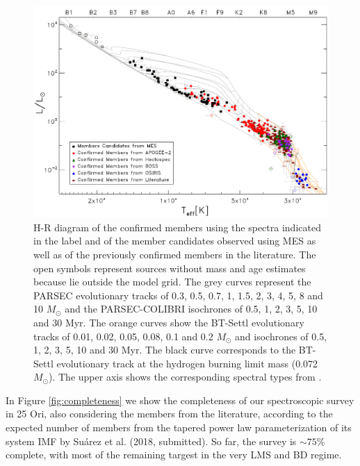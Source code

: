 \documentclass[12pt]{article}
\begin{document}
\begin{figure}%
	\includegraphics[width=1.0\textwidth]{HR_25Ori.pdf}
	\caption[H-R diagram of all the so far confirmed members in this work and of the member candidates to high/intermediate mass stars.]{H-R diagram of the confirmed members using the spectra indicated in the label and of the member candidates observed using MES as well as of the previously confirmed members in the literature. The open symbols represent sources without mass and age estimates because lie outside the model grid. The grey curves represent the PARSEC evolutionary tracks of 0.3, 0.5, 0.7, 1, 1.5, 2, 3, 4, 5, 8 and 10 $M_\odot$ and the PARSEC-COLIBRI isochrones of 0.5, 1, 2, 3, 5, 10 and 30 Myr. The orange curves show the BT-Settl evolutionary tracks of 0.01, 0.02, 0.05, 0.08, 0.1 and 0.2 $M_\odot$ and isochrones of 0.5, 1, 2, 3, 5, 10 and 30 Myr. The black curve corresponds to the BT-Settl evolutionary track at the hydrogen burning limit mass (0.072 $M_\odot$). The upper axis shows the corresponding spectral types from \citet{Pecaut2013}.}
	\label{fig:HR_all}
\end{figure}

In Figure \ref{fig:completeness} we show the completeness of our spectroscopic survey in 25 Ori, also considering the members from the literature, according to the expected number of members from the tapered power law parameterization of its system IMF by Su\'arez et al. (2018, submitted). So far, the survey is $\sim75\%$ complete, with most of the remaining targest in the very LMS and BD regime. %
\end{document}

